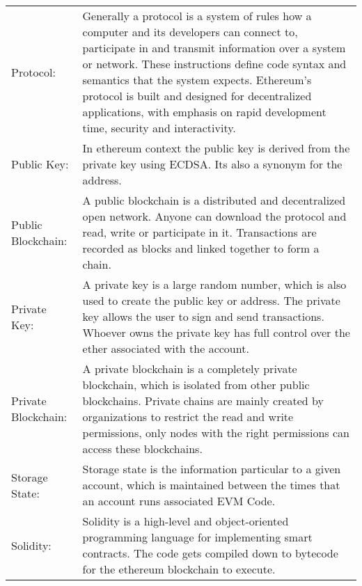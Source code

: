 \begin{center}
	\begin{tabular}{ p{4cm} p{8cm} }
		Protocol: & Generally a protocol is a system of rules how a computer and its developers can connect to, participate in and transmit information over a system or network. These instructions define code syntax and semantics that the system expects. Ethereum's protocol is built and designed for decentralized applications, with emphasis on rapid development time, security and interactivity. \\
		Public Key: & In ethereum context the public key is derived from the private key using \ac{ECDSA}. Its also a synonym for the address.  \\
		Public Blockchain: & A public blockchain is a distributed and decentralized open network. Anyone can download the protocol and read, write or participate in it. Transactions are recorded as blocks and linked together to form a chain. \\
		Private Key: & A private key is a large random number, which is also used to create the public key or address. The private key allows the user to sign and send transactions. Whoever owns the private key has full control over the ether associated with the account. \\
		Private Blockchain: & A private blockchain is a completely private blockchain, which is isolated from other public blockchains. Private chains are mainly created by organizations to restrict the read and write permissions, only nodes with the right permissions can access these blockchains. \\
		Storage State: & Storage state is the information particular to a given account, which is maintained between the times that an account runs associated \ac{EVM Code}. \\
		Solidity: & Solidity is a high-level and object-oriented programming language for implementing smart contracts. The code gets compiled down to bytecode for the ethereum blockchain to execute. \\
	\end{tabular}
\end{center}

\clearpage

